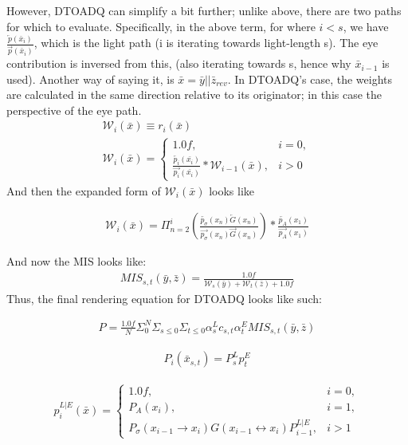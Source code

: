 \documentclass{article}
\begin{document}
    However, DTOADQ can simplify a bit further; unlike above, there are two
    paths for which to evaluate. Specifically, in the above term, for where
    $i < s$, we have
    $\frac{\overleftarrow{p}(\bar{x}_i)}{\overrightarrow{p}(\bar{x}_i)}$, 
    which is the light path (i is iterating towards light-length s). The eye
    contribution is inversed from this, (also iterating towards s, hence why
    $\bar{x}_{i-1}$ is used). Another way of saying it, is $\bar{x} = \bar{y} ||
    \bar{z}_{rev}$.
    In DTOADQ's case, the weights are calculated in
    the same direction relative to its originator; in this case the perspective
    of the eye path.
  \begin{align}
    \mathcal{W}_i(\bar{x}) \equiv r_i(\bar{x})\\
    \mathcal{W}_i (\bar{x}) = 
    \begin{cases}
      1.0f, & i = 0,\\
      \frac{\overleftarrow{p_i}(\bar{x_i})}{\overrightarrow{p_i}(\bar{x_i})} *
      \mathcal{W}_{i-1}(\bar{x}), & i > 0
    \end{cases}
  \end{align}
    And then the expanded form of $\mathcal{W}_i(\bar{x})$ looks like

  \begin{align}
    \mathcal{W}_i(\bar{x}) = \Pi_{n=2}^i(\frac{\overleftarrow
    {p_{\sigma}}(x_n)\overleftarrow {G}(x_n)}
    {\overrightarrow{p_{\sigma}}(x_n)\overrightarrow{G}(x_n)})
    * \frac{\overleftarrow{p_A}(x_1)}{\overrightarrow{p_A}(x_1)}
  \end{align}
 
    And now the MIS looks like:
  \begin{align}
    MIS_{s, t}(\bar{y}, \bar{z}) =
    \frac{1.0f}{\mathcal{W}_s(\bar{y}) + \mathcal{W}_t(\bar{z}) + 1.0f}
  \end{align}
    Thus, the final rendering equation for DTOADQ looks like such:

  \begin{align}
    P = \frac{1.0f}{N} \Sigma_{0}^{N} \Sigma_{s \le 0} \Sigma_{t \le 0}
    \alpha^L_s c_{s,t} \alpha^E_t MIS_{s, t}(\bar{y}, \bar{z})
  \end{align}


  \begin{align}
    P_i(\bar{x}_{s, t}) = P^L_s p^E_t
  \end{align}

  \begin{align}
    p^{L|E}_i(\bar{x}) =
    \begin{cases}
      1.0f, & i = 0,\\
      P_A(x_i), & i = 1,\\
      P_{\sigma}(x_{i-1} \rightarrow x_i) G(x_{i-1} \leftrightarrow x_i)
      P^{L|E}_{i-1}, & i > 1
    \end{cases}
  \end{align}
\end{document}
